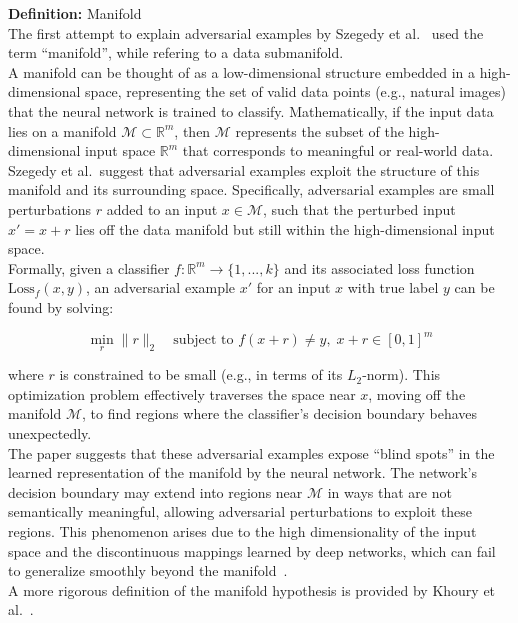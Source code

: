 \documentclass[a4paper, oneside]{discothesis}
\begin{document}
\begin{highlightbox}
	\textbf{Definition:} Manifold \\
	
	The first attempt to explain adversarial examples by Szegedy et al.\ \cite{szegedy2013intriguing} used the term ``manifold'', while refering to a data submanifold. \\
		
	A manifold can be thought of as a low-dimensional structure embedded in a high-dimensional space, representing the set of valid data points (e.g., natural images) that the neural network is trained to classify. Mathematically, if the input data lies on a manifold $\mathcal{M} \subset \mathbb{R}^m$, then $\mathcal{M}$ represents the subset of the high-dimensional input space $\mathbb{R}^m$ that corresponds to meaningful or real-world data. \\

	Szegedy et al.\ suggest that adversarial examples exploit the structure of this manifold and its surrounding space. Specifically, adversarial examples are small perturbations $r$ added to an input $x \in \mathcal{M}$, such that the perturbed input $x' = x + r$ lies off the data manifold but still within the high-dimensional input space. \\
	
	Formally, given a classifier $f: \mathbb{R}^m \to \{1, ..., k\}$ and its associated loss function $\text{Loss}_f(x, y)$, an adversarial example $x'$ for an input $x$ with true label $y$ can be found by solving:
	
	$$\min_{r} \|r\|_2 \quad \text{subject to } f(x + r) \neq y, \; x + r \in [0, 1]^m$$
	
	where $r$ is constrained to be small (e.g., in terms of its $L_2$-norm). This optimization problem effectively traverses the space near $x$, moving off the manifold $\mathcal{M}$, to find regions where the classifier's decision boundary behaves unexpectedly. \\
	
	The paper suggests that these adversarial examples expose ``blind spots'' in the learned representation of the manifold by the neural network. The network's decision boundary may extend into regions near $\mathcal{M}$ in ways that are not semantically meaningful, allowing adversarial perturbations to exploit these regions. This phenomenon arises due to the high dimensionality of the input space and the discontinuous mappings learned by deep networks, which can fail to generalize smoothly beyond the manifold~\cite{khoury2018geometry, Jha2018DetectingAE, Sha2020ADA, dube2018high, shamir2021dimpled}. \\
	
	A more rigorous definition of the manifold hypothesis is provided by Khoury et al.\ \cite{khoury2018geometry}.
\end{highlightbox}
\end{document}
